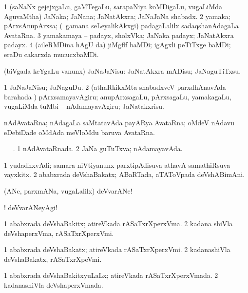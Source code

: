 \bentry
{}
\gl{\nA}
\bmng
\bnum
\num{1} (saNaNx gejejxgaLu, gaMTegaLu, sarapaNiya koMDigaLu, \mo vugaLiMda AguvaMtha) JaNaka; JaNana; JaNatAkxra; JaNaJaNa shabadx. 
\num{2} yamaka; pArxsAnupArxsa; (\kanmu\ gamana seLeyalikAkxgi) padagaLalilx sadaqshanAdagaLa AvataRna. 
\num{3} yamakamaya -- padayx, sholxVka; JaNaka padayx; JaNatAkxra padayx. 
\num{4} (aileRMDina hAgU \AseTxrXV da) jiMgflf baMDi; igAgxli peTiTxge baMDi; eraDu cakarxda mucucxbaMDi. 
\enum
\emng
\eentry

\bentry
{}
\gl{\sakirx}
\bmng
(biVgada keYgaLu \mo vanunx) JaNaJaNisu: JaNatAkxra mADisu; JaNaguTiTxsu. 
\emng

\noindent
\gl{\akirx}
\bmng
\bnum
\num{1} JaNaJaNisu; JaNaguDu. 
\num{2} (athaRkikxMta shabadxveV parxdhAnavAda barahada \vi) pArxsamayavAgiru; anupArxsagaLu, pArxsagaLu, yamakagaLu, \mo vugaLiMda tuMbi -- nAdamayavAgiru; JaNatakxrisu. 
\enum
\emng
\eentry

\bentry
{}
\gl{\nA}
\bmng
nAdAvataRna; nAdagaLa saMtatavAda payARya AvataRna; oMdeV nAdavu eDebiDade oMdAda meVloMdu baruva AvataRna. 
\emng
\eentry

\bentry
{}
\gl{\gu}
\bmng
\tara\  \tama\ . 
\bnum
\num{1} nAdAvataRnada. 
\num{2} JaNa guTuTxva; nAdamayavAda. 
\enum
\emng
\eentry

\bentry
{}
\gl{\nA}
\bmng
\bnum
\num{1} yudadhxvAdi; samara niVtiyanunx parxtipAdisuva athavA samathiRsuva vayxkitx. 
\num{2} ababxrada deVshaBakatx; ABaRTada, aTAToVpada deVshABimAni. 
\enum
\emng
\eentry

\bentry
{}
\gl{\BAavayx}
\bmng
(ANe, parxmANa, \mo vugaLalilx) deVvarANe! 
\emng

\noindent
\gl{\pagu}
\bmng
{}! deVvarANeyAgi! 
\emng
\eentry

\bentry
{}
\gl{\nA}
\bmng
\bnum
\num{1} ababxrada deVshaBakitx; atireVkada rASaTxrXperxVma. 
\num{2} kadana shiVla deVshaperxVma, rASaTxrXperxVmi. 
\enum
\emng
\eentry

\bentry
{}
\gl{\nA}
\bmng
\bnum
\num{1} ababxrada deVshaBakatx; atireVkada rASaTxrXperxVmi. 
\num{2} kadanashiVla deVshaBakatx, rASaTxrXpeVmi. 
\enum
\emng
\eentry

\bentry
{}
\gl{\gu}
\bmng
\bnum
\num{1} ababxrada deVshaBakitxyuLaLx; atireVkada rASaTxrXperxVmada. 
\num{2} kadanashiVla deVshaperxVmada. 
\enum
\emng
\eentry

